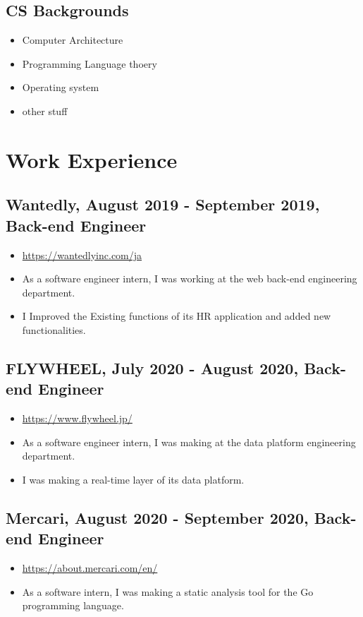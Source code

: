 \documentclass{article}
\begin{document}
    \subsection*{CS Backgrounds}
        \begin{itemize}
            \item Computer Architecture
            \item Programming Language thoery
            \item Operating system
            \item other stuff
        \end{itemize}

\section*{Work Experience}
    \subsection*{Wantedly, August 2019 - September 2019, Back-end Engineer}
        \begin{itemize}
            \item \url{https://wantedlyinc.com/ja}
            \item As a software engineer intern, I was working at the web back-end engineering department.
            \item I Improved the Existing functions of its HR application and added new functionalities.
        \end{itemize}

    \subsection*{FLYWHEEL, July 2020 - August 2020, Back-end Engineer}
        \begin{itemize}
            \item \url{https://www.flywheel.jp/}
            \item As a software engineer intern, I was making at the data platform engineering department.
            \item I was making a real-time layer of its data platform.
        \end{itemize}

    \subsection*{Mercari, August 2020 - September 2020, Back-end Engineer}
        \begin{itemize}
            \item \url{https://about.mercari.com/en/}
            \item As a software intern, I was making a static analysis tool for the Go programming language.
        \end{itemize}
\end{document}
